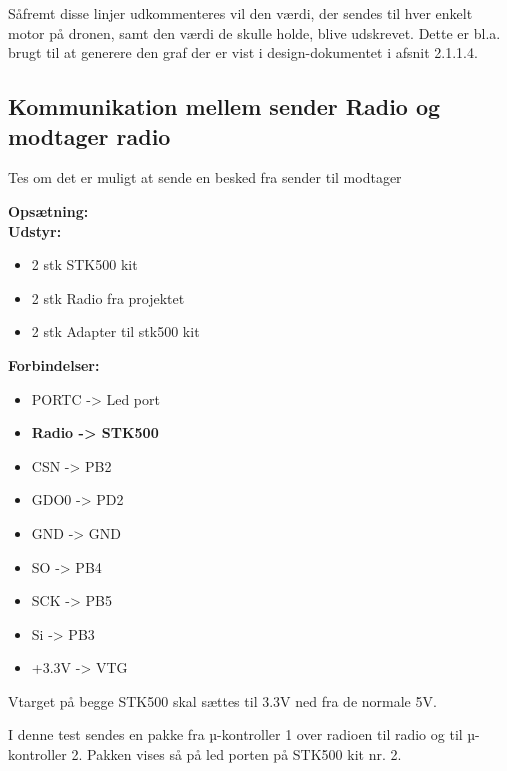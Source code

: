 \documentclass[Main]{subfiles}
\begin{document}
Såfremt disse linjer udkommenteres vil den værdi, der sendes til hver enkelt motor på dronen, samt den værdi de skulle holde, blive udskrevet.
Dette er bl.a. brugt til at generere den graf der er vist i design-dokumentet\cite{Design}  i afsnit 2.1.1.4.


\subsection{Kommunikation mellem sender Radio og modtager radio}
Tes om det er muligt at sende en besked fra sender til modtager

\textbf{Opsætning:}\\
\textbf{Udstyr:}
\begin{itemize}
\item 2 stk STK500 kit
\item 2 stk Radio fra projektet
\item 2 stk Adapter til stk500 kit
\end{itemize}


\textbf{Forbindelser:}
\begin{itemize}
\item PORTC -> Led port
\end{itemize}

\begin{itemize}
\item \textbf{Radio -> 	STK500}
\item CSN	->	PB2
\item GDO0	->	PD2
\item GND	->	GND
\item SO	->	PB4
\item SCK	->	PB5
\item Si	->	PB3
\item +3.3V	->	VTG
\end{itemize}


Vtarget på begge STK500 skal sættes til 3.3V ned fra de normale 5V.

I denne test sendes en pakke fra µ-kontroller 1 over radioen til radio og til µ-kontroller 2. Pakken vises så på led porten på STK500 kit nr. 2.
\end{document}
